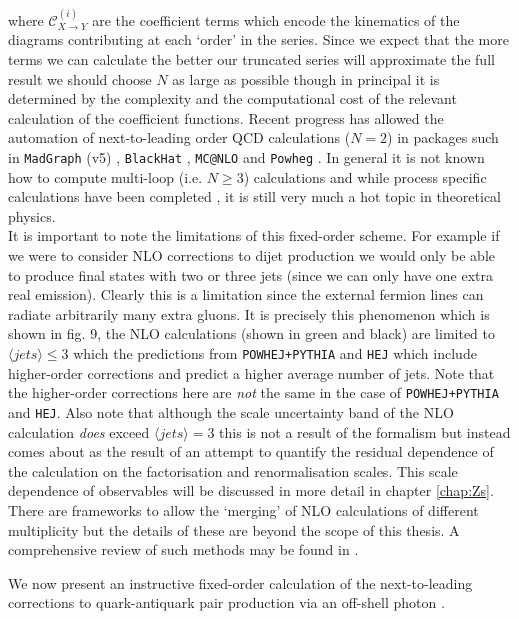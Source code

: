 		where $\mathcal{C}^{(i)}_{X\rightarrow Y}$ are the coefficient terms which encode the kinematics of the diagrams
		contributing at each `order' in the series.  Since we expect that the more terms we can calculate the better our
		truncated series will approximate the full result we should choose $N$ as large as possible though in principal
		it is determined by the complexity and the computational cost of the relevant calculation of the coefficient
		functions.  Recent progress has allowed the automation of next-to-leading order QCD calculations ($N=2$) in
		packages such in \texttt{MadGraph} (v5) \cite{Alwall:2011uj}, \texttt{BlackHat} \cite{Bern:2012my}, \texttt{MC@NLO}
		\cite{Frixione:2010wd} and \texttt{Powheg} \cite{Frixione:2007vw}.  In general it is not known how to compute
		multi-loop (i.e. $N\geq3$) calculations and while process specific calculations have been completed
		\cite{Cacciari:2015jma, Grazzini:2015nwa, Gehrmann:2014fva}, it is still very much a hot topic in theoretical
		physics.\\It is important to note the limitations of this fixed-order scheme.  For example if we were to consider
		NLO corrections to dijet production we would only be able to produce final states with two or three jets (since
		we can only have one extra real emission).  Clearly this is a limitation since the external fermion lines can
		radiate arbitrarily many extra gluons.  It is precisely this phenomenon which is shown in fig. 9,
		the NLO calculations (shown in green and black) are limited to $\langle jets\rangle\leq3$ which the predictions
		from \texttt{POWHEJ+PYTHIA} and \texttt{HEJ} which include higher-order corrections and predict a higher average
		number of jets.  Note that the higher-order corrections here are \emph{not} the same in the case of
		\texttt{POWHEJ+PYTHIA} and \texttt{HEJ}.  Also note that although the scale uncertainty band of the NLO
		calculation \emph{does} exceed $\langle jets\rangle=3$ this is not a result of the formalism but instead comes
		about as the result of an attempt to quantify the residual dependence of the calculation on the factorisation
		and renormalisation scales.  This scale dependence of observables will be discussed in more detail in chapter
		\ref{chap:Zs}.\\There are frameworks to allow the `merging' of NLO calculations of different multiplicity but
		the details of these are beyond the scope of this thesis.  A comprehensive review of such methods may be found
		in \cite{Alwall:2007fs}.

		We now present an instructive fixed-order calculation of the next-to-leading corrections to quark-antiquark pair
		production via an off-shell photon \cite{fieldBook}.

